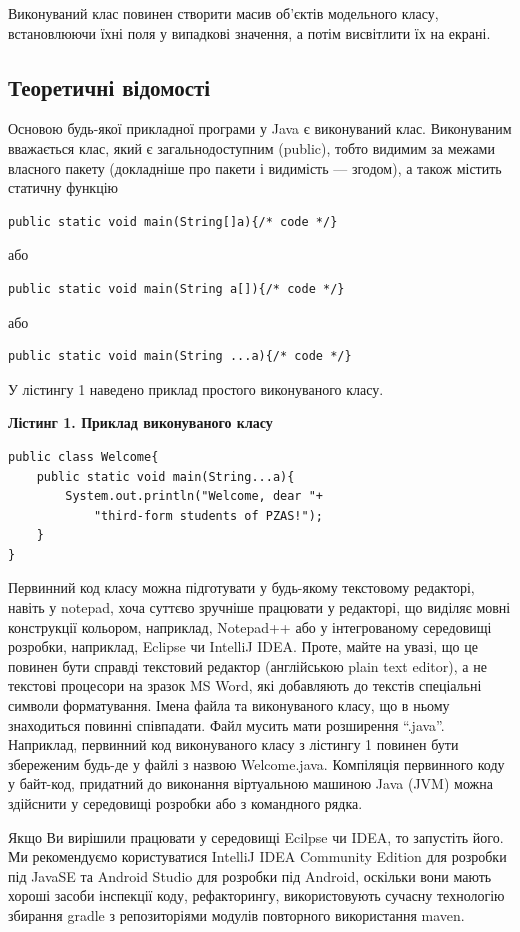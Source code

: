 Виконуваний клас повинен створити масив об’єктів модельного класу, встановлюючи їхні поля у випадкові значення, а потім висвітлити їх на екрані.

\subsection{Теоретичні відомості}
Основою будь-якої прикладної програми у Java є виконуваний клас. Виконуваним вважається клас, який є загальнодоступним (public), тобто видимим за межами власного пакету (докладніше про пакети і видимість --- згодом), а також містить статичну функцію
\begin{lstlisting}
public static void main(String[]a){/* code */}
\end{lstlisting}
або
\begin{lstlisting}
public static void main(String a[]){/* code */}
\end{lstlisting}
або
\begin{lstlisting}
public static void main(String ...a){/* code */}
\end{lstlisting}

У лістингу 1 наведено приклад простого виконуваного класу.

{\bf Лістинг 1.
Приклад виконуваного класу }
\begin{lstlisting}
public class Welcome{
    public static void main(String...a){
        System.out.println("Welcome, dear "+
            "third-form students of PZAS!");
    }
}
\end{lstlisting}
Первинний код класу можна підготувати у будь-якому текстовому редакторі, навіть у notepad, хоча суттєво зручніше працювати у редакторі, що виділяє мовні конструкції кольором, наприклад, Notepad++ або у інтегрованому середовищі розробки, наприклад, Eclipse чи IntelliJ IDEA. Проте, майте на увазі, що це повинен бути справді текстовий редактор (англійською plain text editor), а не текстові процесори на зразок MS Word, які добавляють до текстів спеціальні символи форматування.
Імена файла та виконуваного класу, що в ньому знаходиться повинні співпадати. Файл мусить мати розширення ``.java''. Наприклад, первинний код виконуваного класу з лістингу 1 повинен бути збереженим будь-де у файлі з назвою Welcome.java. 
Компіляція первинного коду у байт-код, придатний до виконання віртуальною машиною Java (JVM) можна здійснити у середовищі розробки або з командного рядка.

Якщо Ви вирішили працювати у середовищі Ecilpse чи IDEA, то запустіть його. Ми рекомендуємо користуватися IntelliJ IDEA Community Edition для розробки під JavaSE та Android Studio для розробки під Android, оскільки вони мають хороші засоби інспекції коду, рефакторингу, використовують сучасну технологію збирання gradle з репозиторіями модулів повторного використання maven. 

